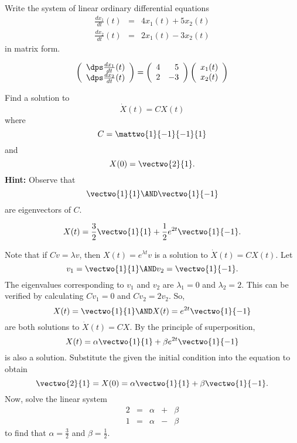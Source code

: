 \documentclass{article}
\begin{document}
\begin{exercise} \label{c4.1.5}
Write the system of linear ordinary differential equations
\begin{eqnarray*}
\frac{dx_1}{dt}(t) & = & 4x_1(t) + 5x_2(t) \\
\frac{dx_2}{dt}(t) & = & 2x_1(t) - 3x_2(t)
\end{eqnarray*}
in matrix form.

\begin{solution}
\ans
\arraystart
\[
\left(\begin{array}{r} \dps\frac{dx_1}{dt}(t) \\ 
\dps\frac{dx_2}{dt}(t)\end{array}\right) =
\left(\begin{array}{rr} 4 & 5 \\ 2 & -3\end{array}\right)
\left(\begin{array}{r} x_1(t) \\ x_2(t)\end{array}\right)
\]
\arrayfinish

\end{solution}
\end{exercise}






\problemlabel

\begin{exercise} \label{c4.5.2}
Find a solution to
\[
\dot{X}(t)=CX(t)
\]
where
\[
C=\mattwo{1}{-1}{-1}{1}
\]
and
\[
X(0)=\vectwo{2}{1}.
\]
{\bf Hint:} Observe that
\[
\vectwo{1}{1} \AND \vectwo{1}{-1}
\]
are eigenvectors of $C$.

\begin{solution}

\ans 
\[
X(t) = \frac{3}{2}\vectwo{1}{1} + \frac{1}{2}e^{2t}\vectwo{1}{-1}.
\]

\soln Note that if $Cv = \lambda v$, then $X(t) = e^{\lambda t}v$ is a
solution to $\dot{X}(t) = CX(t)$.  Let
\[
v_1 = \vectwo{1}{1} \AND v_2 = \vectwo{1}{-1}.
\]
The eigenvalues corresponding to $v_1$ and $v_2$ are
$\lambda_1 = 0$ and $\lambda_2 = 2$.  This can be verified
by calculating $Cv_1 = 0$ and $Cv_2 = 2v_2$.
So,
\[
X(t) = \vectwo{1}{1} \AND X(t) = e^{2t}\vectwo{1}{-1}
\]
are both solutions to $\dot{X}(t) = CX$.  By the principle of
superposition,
\[
X(t) = \alpha\vectwo{1}{1} + \beta e^{2t}\vectwo{1}{-1}
\]
is also a solution.
Substitute the given the initial condition into the equation to obtain
\[
\vectwo{2}{1} = X(0) = \alpha\vectwo{1}{1} + \beta\vectwo{1}{-1}.
\]
Now, solve the linear system
\[
\begin{array}{rrrrr}
2 & = & \alpha & + & \beta \\
1 & = & \alpha & - & \beta \end{array}
\]
to find that $\alpha = \frac{3}{2}$ and $\beta = \frac{1}{2}$.


\end{solution}
\end{exercise}
\end{document}
